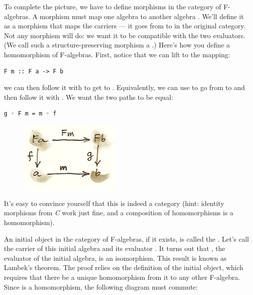 To complete the picture, we have to define morphisms in the category of
F-algebras. A morphism must map one algebra  to another
algebra . We'll define it as a morphism  that
maps the carriers --- it goes from  to  in the
original category. Not any morphism will do: we want it to be compatible
with the two evaluators. (We call such a structure-preserving morphism a
.) Here's how you define a homomorphism of
F-algebras. First, notice that we can lift  to the mapping:

\begin{Verbatim}[commandchars=\\\{\}]
F m :: F a -> F b
\end{Verbatim}
we can then follow it with  to get to .
Equivalently, we can use  to go from  to
 and then follow it with . We want the two paths to
be equal:

\begin{Verbatim}[commandchars=\\\{\}]
g ◦ F m = m ◦ f
\end{Verbatim}

\begin{figure}[H]
\centering
\includegraphics[width=50mm]{images/alg.png}
\end{figure}

\noindent
It's easy to convince yourself that this is indeed a category (hint:
identity morphisms from \emph{C} work just fine, and a composition of
homomorphisms is a homomorphism).

An initial object in the category of F-algebras, if it exists, is called
the . Let's call the carrier of this initial
algebra  and its evaluator
. It turns out that ,
the evaluator of the initial algebra, is an isomorphism. This result is
known as Lambek's theorem. The proof relies on the definition of the
initial object, which requires that there be a unique homomorphism
 from it to any other F-algebra. Since  is a
homomorphism, the following diagram must commute:

